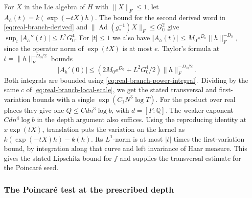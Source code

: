 For \(X\) in the Lie algebra of \(H\) with \(\|X\|_F\le 1\),
let \(A_h(t)=k(\exp(-tX)h)\). The bound for the second derived
word in \eqref{eq:real-branch-derived} and
\(\|\operatorname{Ad}(g_*^{-1})X\|_F\le G_0^2\) give
\(\sup_t |A_h''(t)|\le L^2G_0^4\). For \(|t|\le 1\) we also
have \(|A_h(t)|\le M_0 e^{D_0}\|h\|_F^{-D_0}\), since the
operator norm of \(\exp(tX)\) is at most \(e\). Taylor's formula
at \(t=\|h\|_F^{-D_0/2}\) bounds
\[
 |A_h'(0)|\le
 (2M_0 e^{D_0}+L^2G_0^4/2)\|h\|_F^{-D_0/2} .
\]
Both integrals are bounded using \eqref{eq:real-branch-power-integral}.
Dividing by the same \(c\) of \eqref{eq:real-branch-local-scale},
we get the stated transversal and first-variation bounds with a
single \(\exp(C_1N^3\log T)\). For the product over real places
they give one \(Q\le C d n^3\log b\), with
\(d=[F:\mathbb Q]\). The weaker exponent \(C d n^4\log b\) in
the depth argument also suffices. Using the reproducing identity at
\(x\exp(tX)\), translation puts the variation on the kernel as
\(k(\exp(-tX)h)-k(h)\). Its \(L^1\)-norm is at most \(|t|\) times
the first-variation bound, by integration along that curve and
left invariance of Haar measure. This gives the stated Lipschitz
bound for \(f\) and supplies the transversal estimate for the
Poincar\'e seed.

\subsubsection{The Poincar\'e test at the prescribed depth}

